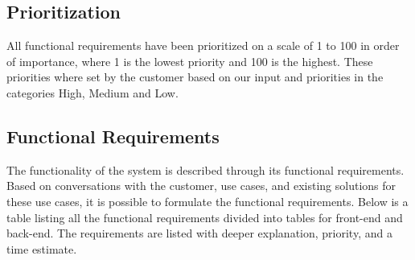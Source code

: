 \documentclass[11pt,a4paper,titlepage,oneside]{report}
\begin{document}
  \subsection{Prioritization}
  All functional requirements have been prioritized on a scale of 1 to 100 in order of importance, where 1 is the lowest priority and 100 is the highest. These priorities where set by the customer based on our input and priorities in the categories High, Medium and Low.

  \subsection{Functional Requirements}
  The functionality of the system is described through its functional requirements. Based on  conversations with the customer, use cases, and existing solutions for these use cases, it is possible to formulate the functional requirements. Below is a table listing all the functional requirements divided into tables for front-end and back-end. The requirements are listed with deeper explanation, priority, and a time estimate.
  \\
\end{document}
